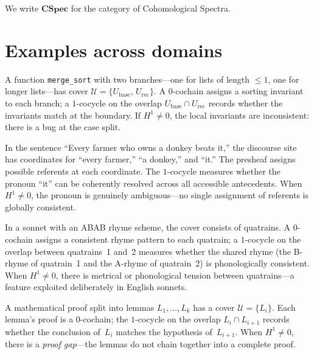 We write $\mathbf{CSpec}$ for the category of Cohomological Spectra.

\section{Examples across domains}
\label{sec:cspec-examples}

\begin{example}
\label{ex:program-bug}
A function \texttt{merge\_sort} with two branches---one for lists of
length $\leq 1$, one for longer lists---has cover
$\mathcal{U} = \{U_{\mathrm{base}},\, U_{\mathrm{rec}}\}$.
A $0$-cochain assigns a sorting invariant to each branch; a $1$-cocycle
on the overlap $U_{\mathrm{base}} \cap U_{\mathrm{rec}}$ records
whether the invariants match at the boundary.
If $H^1 \neq 0$, the local invariants are inconsistent: there is a bug
at the case split.
\end{example}

\begin{example}
\label{ex:nl-ambiguity}
In the sentence ``Every farmer who owns a donkey beats it,'' the
discourse site has coordinates for ``every farmer,'' ``a donkey,'' and
``it.''  The presheaf assigns possible referents at each coordinate.
The $1$-cocycle measures whether the pronoun ``it'' can be coherently
resolved across all accessible antecedents.  When
$H^1 \neq 0$, the pronoun is genuinely ambiguous---no single
assignment of referents is globally consistent.
\end{example}

\begin{example}
\label{ex:poetic-tension}
In a sonnet with an ABAB rhyme scheme, the cover consists of
quatrains.  A $0$-cochain assigns a consistent rhyme pattern to each
quatrain; a $1$-cocycle on the overlap between quatrains~1 and~2
measures whether the shared rhyme (the B-rhyme of quatrain~1 and the
A-rhyme of quatrain~2) is phonologically consistent.  When $H^1 \neq
0$, there is metrical or phonological tension between quatrains---a
feature exploited deliberately in English sonnets.
\end{example}

\begin{example}
\label{ex:proof-gap}
A mathematical proof split into lemmas $L_1, \ldots, L_k$ has a cover
$\mathcal{U} = \{L_i\}$.  Each lemma's proof is a $0$-cochain; the
$1$-cocycle on the overlap $L_i \cap L_{i+1}$ records whether the
conclusion of~$L_i$ matches the hypothesis of~$L_{i+1}$.  When
$H^1 \neq 0$, there is a \emph{proof gap}---the lemmas do not chain
together into a complete proof.
\end{example}


